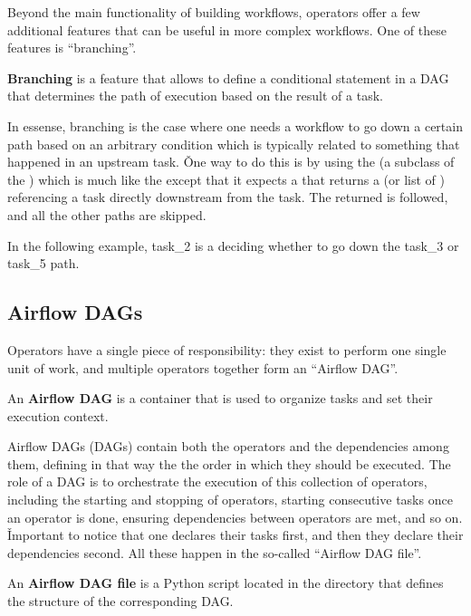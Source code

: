Beyond the main functionality of building workflows, operators offer a few additional features that can be useful in
more complex workflows. One of these features is ``branching''.

\bd[Branching]
\textbf{Branching} is a feature that allows to define a conditional statement in a DAG that determines the path of
execution based on the result of a task.
\ed

In essense, branching is the case where one needs a workflow to go down a certain path based on an arbitrary
condition which is typically related to something that happened in an upstream task. \v

One way to do this is by using the  (a subclass of the ) which is much
like the  except that it expects a  that returns a  (or list
of ) referencing a task directly downstream from the  task. The 
returned is followed, and all the other paths are skipped.

\be
In the following example, task\_2 is a  deciding whether to go down the task\_3 or task\_5
path.

\ee

\subsection{Airflow DAGs}

Operators have a single piece of responsibility: they exist to perform one single unit of work, and multiple operators
together form an ``Airflow DAG''.

An \textbf{Airflow DAG} is a container that is used to organize tasks and set their execution context.
\ed

Airflow DAGs (DAGs) contain both the operators and the dependencies among them, defining in that way the the order
in which they should be executed. The role of a DAG is to orchestrate the execution of this collection of operators,
including the starting and stopping of operators, starting consecutive tasks once an operator is done, ensuring
dependencies between operators are met, and so on. \v

Important to notice that one declares their tasks first, and then they declare their dependencies second. All these
happen in the so-called ``Airflow DAG file''.

An \textbf{Airflow DAG file} is a Python script located in the  directory that defines the structure of the
corresponding DAG\@.
\ed

